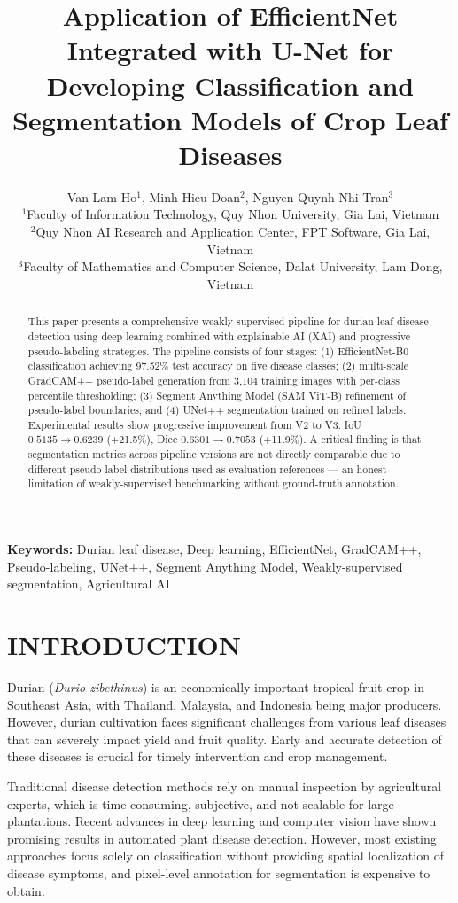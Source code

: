 \documentclass[10pt,a4paper]{article}
\title{\textbf{Application of EfficientNet Integrated with U-Net for Developing Classification and Segmentation Models of Crop Leaf Diseases}}
\author{
Van Lam Ho$^{1}$, Minh Hieu Doan$^{2}$, Nguyen Quynh Nhi Tran$^{3}$ \\
\small $^1$Faculty of Information Technology, Quy Nhon University, Gia Lai, Vietnam \\
\small $^2$Quy Nhon AI Research and Application Center, FPT Software, Gia Lai, Vietnam \\
\small $^3$Faculty of Mathematics and Computer Science, Dalat University, Lam Dong, Vietnam
}
\date{}
\begin{document}
\maketitle

\begin{abstract}
This paper presents a comprehensive weakly-supervised pipeline for durian leaf disease detection using deep learning combined with explainable AI (XAI) and progressive pseudo-labeling strategies. The pipeline consists of four stages: (1) EfficientNet-B0 classification achieving 97.52\% test accuracy on five disease classes; (2) multi-scale GradCAM++ pseudo-label generation from 3,104 training images with per-class percentile thresholding; (3) Segment Anything Model (SAM ViT-B) refinement of pseudo-label boundaries; and (4) UNet++ segmentation trained on refined labels. Experimental results show progressive improvement from V2 to V3: IoU $0.5135 \to 0.6239$ (+21.5\%), Dice $0.6301 \to 0.7053$ (+11.9\%). A critical finding is that segmentation metrics across pipeline versions are not directly comparable due to different pseudo-label distributions used as evaluation references --- an honest limitation of weakly-supervised benchmarking without ground-truth annotation.
\end{abstract}

\textbf{Keywords:} Durian leaf disease, Deep learning, EfficientNet, GradCAM++, Pseudo-labeling, UNet++, Segment Anything Model, Weakly-supervised segmentation, Agricultural AI

\section{INTRODUCTION}

Durian (\textit{Durio zibethinus}) is an economically important tropical fruit crop in Southeast Asia, with Thailand, Malaysia, and Indonesia being major producers. However, durian cultivation faces significant challenges from various leaf diseases that can severely impact yield and fruit quality. Early and accurate detection of these diseases is crucial for timely intervention and crop management.

Traditional disease detection methods rely on manual inspection by agricultural experts, which is time-consuming, subjective, and not scalable for large plantations. Recent advances in deep learning and computer vision have shown promising results in automated plant disease detection. However, most existing approaches focus solely on classification without providing spatial localization of disease symptoms, and pixel-level annotation for segmentation is expensive to obtain.
\end{document}
